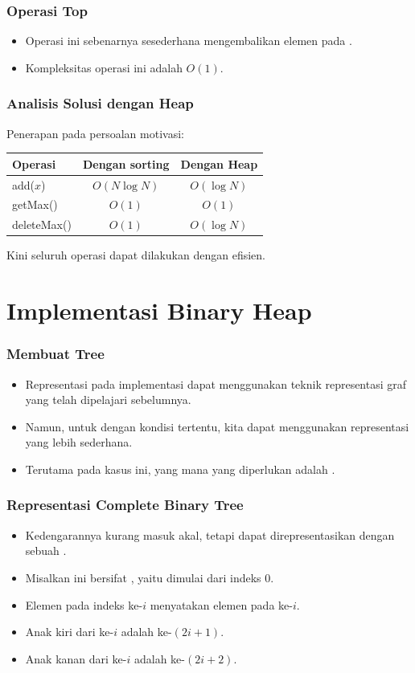 \begin{frame}
\frametitle{Operasi Top}
\begin{itemize}
  \item Operasi ini sebenarnya sesederhana mengembalikan elemen pada  \pbinaryHeap.
  \item Kompleksitas operasi ini adalah $O(1)$.
\end{itemize}
\end{frame}

\begin{frame}
\frametitle{Analisis Solusi dengan Heap}
Penerapan \pheap pada persoalan motivasi:
\begin{table}[ht]
  \begin{tabular}{|l|c|c|}
    \hline Operasi  & Dengan sorting & Dengan Heap \\
    \hline  add($x$) & $O(N \log{N})$ & $O(\log{N})$\\
    \hline  getMax() & $O(1)$ & $O(1)$\\
    \hline  deleteMax() & $O(1)$ & $O(\log{N})$\\
    \hline
  \end{tabular}
\end{table}  

Kini seluruh operasi dapat dilakukan dengan efisien.
\end{frame}

\section{Implementasi Binary Heap}
\frame{\sectionpage}

\begin{frame}
\frametitle{Membuat Tree}
\begin{itemize}
  \item Representasi \ftree pada implementasi dapat menggunakan teknik representasi graf yang telah dipelajari sebelumnya.
  \item Namun, untuk \ftree dengan kondisi tertentu, kita dapat menggunakan representasi yang lebih sederhana.
  \item Terutama pada kasus ini, yang mana \ftree yang diperlukan adalah .
\end{itemize}
\end{frame}

\begin{frame}
\frametitle{Representasi Complete Binary Tree}
\begin{itemize}
  \item Kedengarannya kurang masuk akal, tetapi  dapat direpresentasikan dengan sebuah \farray.
  \item Misalkan \farray ini bersifat , yaitu dimulai dari indeks 0.
  \item Elemen pada indeks ke-$i$ menyatakan elemen pada \fnode ke-$i$.
  \item Anak kiri dari \fnode ke-$i$ adalah \fnode ke-$(2i+1)$. 
  \item Anak kanan dari \fnode ke-$i$ adalah \fnode ke-$(2i+2)$. 
\end{itemize}
\end{frame}

